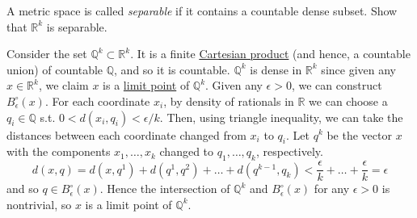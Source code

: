   \begin{exercise}[Rudin 2.22]
    A metric space is called \textit{separable} if it contains a countable dense subset. Show that $\mathbb{R}^k$ is separable. 
  \end{exercise}
  \begin{solution}
    Consider the set $\mathbb{Q}^k \subset \mathbb{R}^k$. It is a finite \hyperref[st-def:cart-prod-2]{Cartesian product} (and hence, a countable union) of countable $\mathbb{Q}$, and so it is countable. $\mathbb{Q}^k$ is dense in $\mathbb{R}^k$ since given any $x \in \mathbb{R}^k$, we claim $x$ is a \hyperref[pst-def:limit-point]{limit point} of $\mathbb{Q}^k$. Given any $\epsilon > 0$, we can construct $B_\epsilon^\circ (x)$. For each coordinate $x_i$, by density of rationals in $\mathbb{R}$ we can choose a $q_i \in \mathbb{Q}$ s.t. $0 < d(x_i, q_i) < \epsilon / k$. Then, using triangle inequality, we can take the distances between each coordinate changed from $x_i$ to $q_i$. Let $q^k$ be the vector $x$ with the components $x_1, \ldots, x_k$ changed to $q_1, \ldots, q_k$, respectively. 
    \begin{equation}
      d(x, q) = d(x, q^1) + d(q^1, q^2) + \ldots + d(q^{k-1}, q_k) < \frac{\epsilon}{k} + \ldots + \frac{\epsilon}{k} = \epsilon
    \end{equation}
    and so $q \in B_\epsilon^\circ (x)$. Hence the intersection of $\mathbb{Q}^k$ and $B_\epsilon^\circ (x)$ for any $\epsilon > 0$ is nontrivial, so $x$ is a limit point of $\mathbb{Q}^k$. 
  \end{solution}

